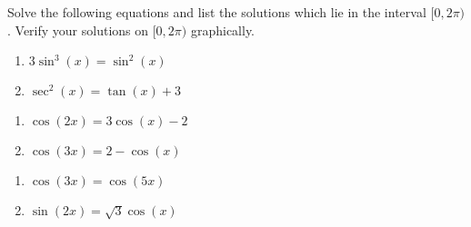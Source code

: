 \begin{ex} \label{TrigEqIdEx1}  Solve the following equations and list the solutions which lie in the interval $[0,2\pi)$.  Verify your solutions on $[0,2\pi)$ graphically.

\begin{multicols}{2}

\begin{enumerate}

\item  $3\sin^{3}(x) = \sin^{2}(x)$
\item $\sec^{2}(x) = \tan(x) + 3$

\setcounter{HW}{\value{enumi}}

\end{enumerate}

\end{multicols}

\begin{multicols}{2}

\begin{enumerate}

\setcounter{enumi}{\value{HW}}

\item   $\cos(2x) = 3\cos(x) - 2$
\item  $\cos(3x) = 2- \cos(x)$

\setcounter{HW}{\value{enumi}}

\end{enumerate}

\end{multicols}

\begin{multicols}{2}

\begin{enumerate}

\setcounter{enumi}{\value{HW}}

\item  $\cos(3x) = \cos(5x)$
\item $\sin(2x) =\sqrt{3} \cos(x)$

\setcounter{HW}{\value{enumi}}

\end{enumerate}

\end{multicols}

\begin{multicols}{2}

\begin{enumerate}

\setcounter{enumi}{\value{HW}}


\end{enumerate}
\end{multicols}
\end{ex}
